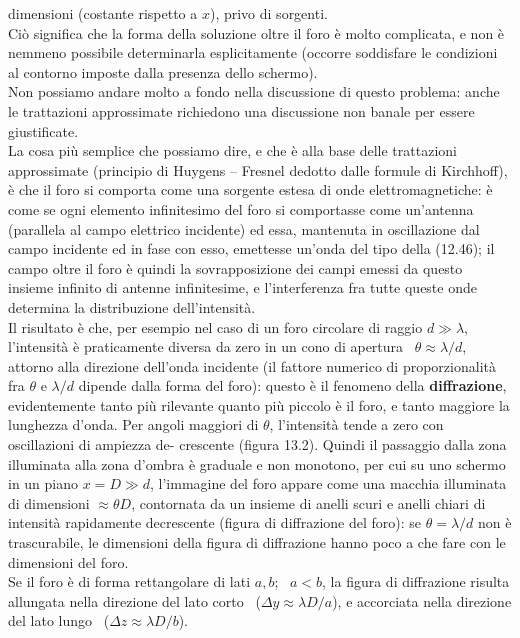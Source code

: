dimensioni (costante rispetto a $x$), privo di sorgenti.\\
Ci\`o significa che la forma della soluzione oltre il foro \`e molto complicata,
e non \`e nemmeno possibile determinarla esplicitamente (occorre soddisfare le
condizioni al contorno imposte dalla presenza dello schermo).\\
Non possiamo andare molto a fondo nella discussione di questo problema: anche le
trattazioni approssimate richiedono una discussione non banale per essere
giustificate.\\
La cosa pi\`u semplice che possiamo dire, e che \`e alla base delle trattazioni
approssimate (principio di Huygens -- Fresnel dedotto dalle formule di
Kirchhoff), \`e che il foro si comporta come una sorgente estesa di onde
elettromagnetiche: \`e come se ogni elemento infinitesimo del foro si
comportasse come un'antenna (parallela al campo elettrico incidente) ed essa,
mantenuta in oscillazione dal campo incidente ed in fase con esso, emettesse
un'onda del tipo della (12.46); il campo oltre il foro \`e quindi la
sovrapposizione dei campi emessi da questo insieme infinito di antenne
infinitesime, e l'interferenza fra tutte queste onde determina la distribuzione
dell'intensit\`a.\\
Il risultato \`e che, per esempio nel caso di un foro circolare di raggio
$d\gg\lambda$, l'intensit\`a \`e praticamente diversa da zero in un cono di
apertura \ $\theta\approx\lambda/d$, attorno alla direzione dell'onda incidente
(il fattore numerico di proporzionalit\`a fra $\theta$ e $\lambda/d$ dipende
dalla forma del foro): questo \`e il fenomeno della \textbf{diffrazione},
evidentemente tanto pi\`u rilevante quanto pi\`u piccolo \`e il foro, e tanto
maggiore la lunghezza d'onda. Per angoli maggiori di $\theta$, l'intensit\`a
tende a zero con oscillazioni di ampiezza de-
crescente (figura 13.2). Quindi il passaggio dalla zona illuminata alla zona
d'ombra \`e graduale e non monotono, per cui su uno schermo in un piano
$x=D\gg d$, l'immagine del foro appare come una macchia illuminata di dimensioni
$\approx\theta D$, contornata da un insieme di anelli scuri e anelli chiari di
intensit\`a rapidamente decrescente (figura di diffrazione del foro): se
$\theta=\lambda/d$ non \`e trascurabile, le dimensioni della figura di
diffrazione hanno poco a che fare con le dimensioni del foro.\\
Se il foro \`e di forma rettangolare di lati $a,b$; \ $a<b$, la figura di
diffrazione risulta allungata nella direzione del lato corto
\ ($\Delta y\approx\lambda D/a$), e accorciata nella direzione del lato lungo
\ ($\Delta z\approx\lambda D/b$).

